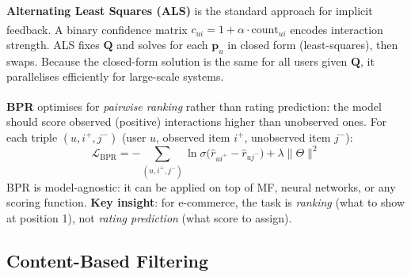 \begin{tcbitemize}[ skin=sectionraster ]
    \tcbitem[title={ALS for Implicit Feedback}, raster multicolumn=3]
    \textbf{Alternating Least Squares (ALS)} is the standard approach for implicit feedback\textsuperscript{\cite[][pp.~40--45]{korenMatrixFactorizationTechniques2009}}.
    A binary confidence matrix $c_{ui} = 1 + \alpha \cdot \text{count}_{ui}$ encodes interaction strength.
    ALS fixes $\mathbf{Q}$ and solves for each $\mathbf{p}_u$ in closed form (least-squares), then swaps.
    Because the closed-form solution is the same for all users given $\mathbf{Q}$, it parallelises efficiently for large-scale systems.

    \tcbitem[title={Bayesian Personalised Ranking (BPR)}, raster multicolumn=6]
    \textbf{BPR} optimises for \emph{pairwise ranking} rather than rating prediction\textsuperscript{\cite[][p.~1]{rendleBPRBayesianPersonalized2009}}: the model should score observed (positive) interactions higher than unobserved ones.
    For each triple $(u, i^+, j^-)$ (user $u$, observed item $i^+$, unobserved item $j^-$):
    \begin{equation}
        \mathcal{L}_{\text{BPR}} = -\sum_{(u,i^+,j^-)} \ln\sigma\!\bigl(\hat{r}_{ui^+} - \hat{r}_{uj^-}\bigr) + \lambda \|\Theta\|^2
    \end{equation}
    BPR is model-agnostic: it can be applied on top of MF, neural networks, or any scoring function.
    \textbf{Key insight}: for e-commerce, the task is \emph{ranking} (what to show at position 1), not \emph{rating prediction} (what score to assign).

\end{tcbitemize}

\subsection{Content-Based Filtering}

